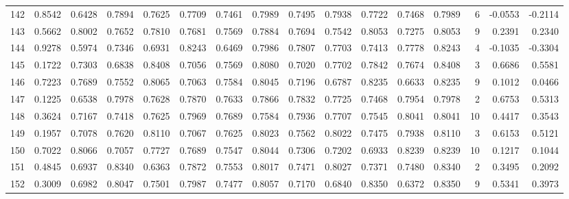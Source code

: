 \begin{tabular}{lrrrrrrrrrrrrrrr}
142 &      0.8542 &  0.6428 &  0.7894 &  0.7625 &  0.7709 &  0.7461 &  0.7989 &  0.7495 &  0.7938 &  0.7722 &   0.7468 &     0.7989 &      6 &                   -0.0553 &                    -0.2114 \\
143 &      0.5662 &  0.8002 &  0.7652 &  0.7810 &  0.7681 &  0.7569 &  0.7884 &  0.7694 &  0.7542 &  0.8053 &   0.7275 &     0.8053 &      9 &                    0.2391 &                     0.2340 \\
144 &      0.9278 &  0.5974 &  0.7346 &  0.6931 &  0.8243 &  0.6469 &  0.7986 &  0.7807 &  0.7703 &  0.7413 &   0.7778 &     0.8243 &      4 &                   -0.1035 &                    -0.3304 \\
145 &      0.1722 &  0.7303 &  0.6838 &  0.8408 &  0.7056 &  0.7569 &  0.8080 &  0.7020 &  0.7702 &  0.7842 &   0.7674 &     0.8408 &      3 &                    0.6686 &                     0.5581 \\
146 &      0.7223 &  0.7689 &  0.7552 &  0.8065 &  0.7063 &  0.7584 &  0.8045 &  0.7196 &  0.6787 &  0.8235 &   0.6633 &     0.8235 &      9 &                    0.1012 &                     0.0466 \\
147 &      0.1225 &  0.6538 &  0.7978 &  0.7628 &  0.7870 &  0.7633 &  0.7866 &  0.7832 &  0.7725 &  0.7468 &   0.7954 &     0.7978 &      2 &                    0.6753 &                     0.5313 \\
148 &      0.3624 &  0.7167 &  0.7418 &  0.7625 &  0.7969 &  0.7689 &  0.7584 &  0.7936 &  0.7707 &  0.7545 &   0.8041 &     0.8041 &     10 &                    0.4417 &                     0.3543 \\
149 &      0.1957 &  0.7078 &  0.7620 &  0.8110 &  0.7067 &  0.7625 &  0.8023 &  0.7562 &  0.8022 &  0.7475 &   0.7938 &     0.8110 &      3 &                    0.6153 &                     0.5121 \\
150 &      0.7022 &  0.8066 &  0.7057 &  0.7727 &  0.7689 &  0.7547 &  0.8044 &  0.7306 &  0.7202 &  0.6933 &   0.8239 &     0.8239 &     10 &                    0.1217 &                     0.1044 \\
151 &      0.4845 &  0.6937 &  0.8340 &  0.6363 &  0.7872 &  0.7553 &  0.8017 &  0.7471 &  0.8027 &  0.7371 &   0.7480 &     0.8340 &      2 &                    0.3495 &                     0.2092 \\
152 &      0.3009 &  0.6982 &  0.8047 &  0.7501 &  0.7987 &  0.7477 &  0.8057 &  0.7170 &  0.6840 &  0.8350 &   0.6372 &     0.8350 &      9 &                    0.5341 &                     0.3973 \\

\end{tabular}
